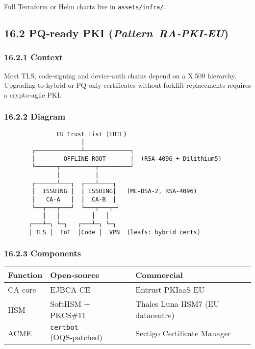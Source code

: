 \documentclass[
  english,
]{article}
\begin{document}
Full Terraform or Helm charts live in \texttt{assets/infra/}.

\subsection{\texorpdfstring{16.2 PQ‑ready PKI
(\emph{Pattern~RA‑PKI‑EU})}{16.2 PQ‑ready PKI (Pattern~RA‑PKI‑EU)}}\label{pqready-pki-pattern-rapkieu}

\subsubsection{16.2.1 Context}\label{context}

Most TLS, code‑signing and device‑auth chains depend on a X.509
hierarchy. Upgrading to hybrid or PQ‑only certificates without forklift
replacements requires a crypto‑agile PKI.

\subsubsection{16.2.2 Diagram}\label{diagram}

\begin{verbatim}
               EU Trust List (EUTL)
                      │
        ┌─────────────┴─────────────┐
        │        OFFLINE ROOT       │  (RSA‑4096 + Dilithium5)
        └──────┬──────────┬─────────┘
               │          │
        ┌──────┴───┐  ┌───┴────┐
        │  ISSUING │  │ ISSUING│   (ML‑DSA‑2, RSA‑4096)
        │   CA‑A   │  │  CA‑B  │
        └──┬───┬───┘  └───┬───┬─┘
           │   │         │   │
       ┌───┴─┐ └─┐   ┌───┴─┐ └─┐
       │ TLS │  IoT  │Code │  VPN  (leafs: hybrid certs)
\end{verbatim}

\subsubsection{16.2.3 Components}\label{components}

\begin{longtable}[]{@{}
  >{\raggedright\arraybackslash}p{}
  >{\raggedright\arraybackslash}p{}
  >{\raggedright\arraybackslash}p{}@{}}
\toprule\noalign{}
\begin{minipage}[b]{\linewidth}\raggedright
Function
\end{minipage} & \begin{minipage}[b]{\linewidth}\raggedright
Open‑source
\end{minipage} & \begin{minipage}[b]{\linewidth}\raggedright
Commercial
\end{minipage} \\
\midrule\noalign{}
\endhead
\bottomrule\noalign{}
\endlastfoot
CA core & EJBCA CE & Entrust PKIaaS EU \\
HSM & SoftHSM + PKCS\#11 & Thales Luna HSM7 (EU datacentre) \\
ACME & \texttt{certbot} (OQS‑patched) & Sectigo Certificate Manager \\
\end{longtable}
\end{document}
